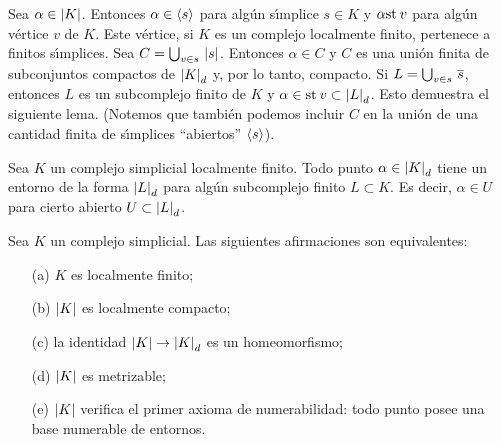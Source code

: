 Sea $\alpha\in\left|K\right|$. Entonces $\alpha\in\langle s\rangle$ para
alg\'{u}n s\'{\i}mplice $s\in K$ y $\alpha\mathrm{st}_{}\,v$ para alg\'{u}n
v\'{e}rtice $v$ de $K$. Este v\'{e}rtice, si $K$ es un complejo localmente
finito, pertenece a finitos s\'{\i}mplices. Sea $C=\bigcup_{v\in s}\,\left|s\right|$.
Entonces $\alpha\in C$ y $C$ es una uni\'{o}n finita de subconjuntos
compactos de $\left|K\right|_{d}$ y, por lo tanto, compacto. Si
$L=\bigcup_{v\in s}\,\overline{s}$, entonces $L$ es un subcomplejo finito de $K$
y $\alpha\in\mathrm{st}_{}\,v\subset\left|L\right|_{d}$. Esto demuestra el siguiente lema.
(Notemos que tambi\'{e}n podemos incluir $C$ en la uni\'{o}n de una cantidad
finita de s\'{\i}mplices ``abiertos'' $\langle s\rangle$).

\begin{lemaLocalmenteFinitoLocalmenteFinito}
	\label{thm:localmentefinitolocalmentefinito}
	Sea $K$ un complejo simplicial localmente finito. Todo punto
	$\alpha\in \left|K\right|_{d}$ tiene un entorno de la forma
	$\left|L\right|_{d}$ para alg\'{u}n subcomplejo finito $L\subset K$.
	Es decir, $\alpha\in U$ para cierto abierto $U\subset\left|L\right|_{d}$.
\end{lemaLocalmenteFinitoLocalmenteFinito}

\begin{teoEquivalenciasLocalmenteFinito}%
	\label{thm:equivalenciaslocalmentefinito}
	Sea $K$ un complejo simplicial. Las siguientes afirmaciones son
	equivalentes:
	\begin{itemize}
		\item[(a)] $K$ es localmente finito;
		\item[(b)] $\left|K\right|$ es localmente compacto;
		\item[(c)] la identidad $\left|K\right|\rightarrow\left|K\right|_{d}$ es
			un homeomorfismo;
		\item[(d)] $\left|K\right|$ es metrizable;
		\item[(e)] $\left|K\right|$ verifica el primer axioma de
			numerabilidad: todo punto posee una base numerable de
			entornos.
	\end{itemize}
\end{teoEquivalenciasLocalmenteFinito}

